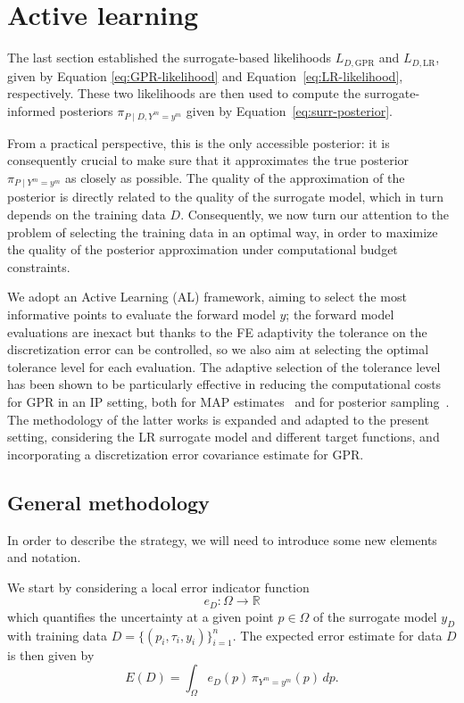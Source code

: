 \section{Active learning}\label{sec:AL}
The last section established the surrogate-based likelihoods $L_{D, \text{GPR}}$ and $L_{D, \text{LR}}$, given by Equation \eqref{eq:GPR-likelihood} and Equation~\eqref{eq:LR-likelihood}, respectively.
These two likelihoods are then used to compute the surrogate-informed posteriors $\pi_{P\mid D, Y^m = y^m} $ given by Equation~\eqref{eq:surr-posterior}.

From a practical perspective, this is the only accessible posterior: it is consequently crucial to make sure that it approximates the true posterior $\pi_{P\mid Y^m = y^m}$ as closely as possible.
The quality of the approximation of the posterior is directly related to the quality of the surrogate model, which in turn depends on the training data $D$.
Consequently, we now turn our attention to the problem of selecting the training data in an optimal way, in order to maximize the quality of the posterior approximation under computational budget constraints.

We adopt an Active Learning (AL) framework, aiming to select the most informative points to evaluate the forward model $y$; the forward model evaluations are inexact but thanks to the FE adaptivity the tolerance on the discretization error can be controlled, so we also aim at selecting the optimal tolerance level for each evaluation.
The adaptive selection of the tolerance level has been shown to be particularly effective in reducing the computational costs for GPR in an IP setting, both for MAP estimates~\cite{SemlerWeiser2023,SemlerWeiser2024} and for posterior sampling~\cite{VillaniUngerWeiser2024}.
The methodology of the latter works is expanded and adapted to the present setting, considering the LR surrogate model and different target functions, and incorporating a discretization error covariance estimate for GPR. 

\subsection{General methodology}\label{sec:AL-method}

In order to describe the strategy, we will need to introduce some new elements and notation. \medbreak 

We start by considering a local error indicator function 
\begin{equation} \label{eq:loc-err-ind}
    e_{D} : \Omega \to \mathbb R
\end{equation} 
which quantifies the uncertainty at a given point $p \in \Omega$ of the surrogate model $y_D$ with training data $D=\{(p_i, \tau_i, y_i)\}_{i=1}^n$.
The expected error estimate for data $D$ is then given by
\begin{equation} \label{eq:glob-err-ind}
    E(D) = \int_{\Omega} e_{D}(p) \, \pi_{ Y^m = y^m}(p) \, dp.
\end{equation}

